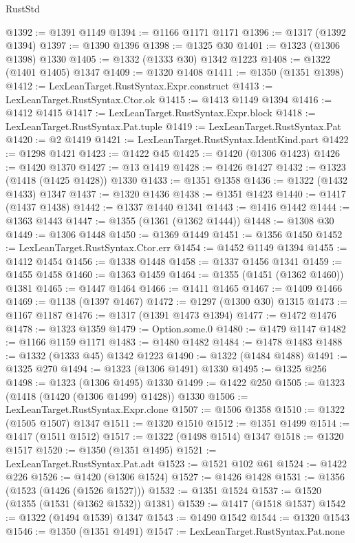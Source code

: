 \begin{lexlean}{RustStd}
\begin{coremodule}
{\begin{coremodule}
{{{{{{{{{{{{{{{{{{{{{{{{{{{{{{{{{{@1392 := @1391 @1149
@1394 := @1166 @1171 @1171
@1396 := @1317 (@1392 @1394)
@1397 := @1390 @1396
@1398 := @1325 @30
@1401 := @1323 (@1306 @1398) @1330
@1405 := @1332 (@1333 @30) @1342 @1223
@1408 := @1322 (@1401 @1405) @1347
@1409 := @1320 @1408
@1411 := @1350 (@1351 @1398)
@1412 := LexLeanTarget.RustSyntax.Expr.construct
@1413 := LexLeanTarget.RustSyntax.Ctor.ok
@1415 := @1413 @1149 @1394
@1416 := @1412 @1415
@1417 := LexLeanTarget.RustSyntax.Expr.block
@1418 := LexLeanTarget.RustSyntax.Pat.tuple
@1419 := LexLeanTarget.RustSyntax.Pat
@1420 := @2 @1419
@1421 := LexLeanTarget.RustSyntax.IdentKind.part
@1422 := @1298 @1421
@1423 := @1422 @45
@1425 := @1420 (@1306 @1423)
@1426 := @1420 @1370
@1427 := @13 @1419
@1428 := @1426 @1427
@1432 := @1323 (@1418 (@1425 @1428)) @1330
@1433 := @1351 @1358
@1436 := @1322 (@1432 @1433) @1347
@1437 := @1320 @1436
@1438 := @1351 @1423
@1440 := @1417 (@1437 @1438)
@1442 := @1337 @1440 @1341
@1443 := @1416 @1442
@1444 := @1363 @1443
@1447 := @1355 (@1361 (@1362 @1444))
@1448 := @1308 @30
@1449 := @1306 @1448
@1450 := @1369 @1449
@1451 := @1356 @1450
@1452 := LexLeanTarget.RustSyntax.Ctor.err
@1454 := @1452 @1149 @1394
@1455 := @1412 @1454
@1456 := @1338 @1448
@1458 := @1337 @1456 @1341
@1459 := @1455 @1458
@1460 := @1363 @1459
@1464 := @1355 (@1451 (@1362 @1460)) @1381
@1465 := @1447 @1464
@1466 := @1411 @1465
@1467 := @1409 @1466
@1469 := @1138 (@1397 @1467)
@1472 := @1297 (@1300 @30) @1315
@1473 := @1167 @1187
@1476 := @1317 (@1391 @1473 @1394)
@1477 := @1472 @1476
@1478 := @1323 @1359
@1479 := Option.some.{0}
@1480 := @1479 @1147
@1482 := @1166 @1159 @1171
@1483 := @1480 @1482
@1484 := @1478 @1483
@1488 := @1332 (@1333 @45) @1342 @1223
@1490 := @1322 (@1484 @1488)
@1491 := @1325 @270
@1494 := @1323 (@1306 @1491) @1330
@1495 := @1325 @256
@1498 := @1323 (@1306 @1495) @1330
@1499 := @1422 @250
@1505 := @1323 (@1418 (@1420 (@1306 @1499) @1428)) @1330
@1506 := LexLeanTarget.RustSyntax.Expr.clone
@1507 := @1506 @1358
@1510 := @1322 (@1505 @1507) @1347
@1511 := @1320 @1510
@1512 := @1351 @1499
@1514 := @1417 (@1511 @1512)
@1517 := @1322 (@1498 @1514) @1347
@1518 := @1320 @1517
@1520 := @1350 (@1351 @1495)
@1521 := LexLeanTarget.RustSyntax.Pat.adt
@1523 := @1521 @102 @61
@1524 := @1422 @226
@1526 := @1420 (@1306 @1524)
@1527 := @1426 @1428
@1531 := @1356 (@1523 (@1426 (@1526 @1527)))
@1532 := @1351 @1524
@1537 := @1520 (@1355 (@1531 (@1362 @1532)) @1381)
@1539 := @1417 (@1518 @1537)
@1542 := @1322 (@1494 @1539) @1347
@1543 := @1490 @1542
@1544 := @1320 @1543
@1546 := @1350 (@1351 @1491)
@1547 := LexLeanTarget.RustSyntax.Pat.none
}}}}}}}}}}}}}}}}}}}}}}}}}}}}}}}}}}
\end{coremodule}}
\end{coremodule}
\end{lexlean}
